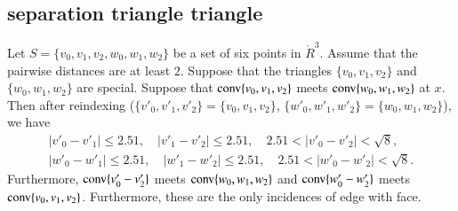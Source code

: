 \newpage

\subsection{separation triangle triangle}

\begin{lemma}
Let $S=\{v_0,v_1,v_2,w_0,w_1,w_2\}$ be a set of six points in
$\ring{R}^3$.  Assume that the pairwise distances are at least $2$.
Suppose that the triangles $\{v_0,v_1,v_2\}$ and $\{w_0,w_1,w_2\}$
are special.  Suppose that ${\operatorname{conv}}\{v_0,v_1,v_2\}$ meets
${\operatorname{conv}}\{w_0,w_1,w_2\}$ at $x$.  Then after reindexing
($\{v'_0,v'_1,v'_2\}=\{v_0,v_1,v_2\}$, $\{w'_0,w'_1,w'_2\} = \{w_0,w_1,w_2\}$),
we have 
   $$
   \begin{array}{lll}
   |v'_0-v'_1|\le 2.51,\quad |v'_1-v'_2|\le 2.51,\quad 2.51 < |v'_0-v'_2|<\sqrt8,\\
   |w'_0-w'_1|\le 2.51,\quad |w'_1-w'_2|\le 2.51,\quad 2.51 < |w'_0-w'_2|<\sqrt8.
   \end{array}
   $$
Furthermore, ${\operatorname{conv}}\{v'_0-v'_2\}$ meets ${\operatorname{conv}}\{w_0,w_1,w_2\}$
and  ${\operatorname{conv}}\{w'_0-w'_2\}$ meets ${\operatorname{conv}}\{v_0,v_1,v_2\}$.
Furthermore, these are the only incidences of edge with face.
\end{lemma}

